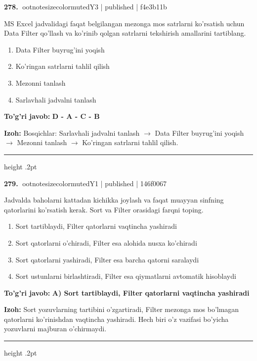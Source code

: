 \documentclass[10pt,a4paper]{article}
\begin{document}
\textbf{\color{ink}278.} {ootnotesizecolor{muted}Y3 | published | f4e3b11b}
\par
MS Excel jadvalidagi faqat belgilangan mezonga mos satrlarni ko'rsatish uchun Data Filter qo'llash va ko'rinib qolgan satrlarni tekshirish amallarini tartiblang.
\begin{enumerate}[label=\Alph*),leftmargin=9mm]
\item Data Filter buyrug'ini yoqish
\item Ko'ringan satrlarni tahlil qilish
\item Mezonni tanlash
\item Sarlavhali jadvalni tanlash
\end{enumerate}
\begin{tcolorbox}[enhanced,breakable,colback=teal!4,colframe=teal!55!black,boxrule=0.45pt,arc=1.2mm,left=2.8mm,right=2.8mm,top=2mm,bottom=2mm]
\textbf{\color{teal}To'g'ri javob:} \textbf{D - A - C - B}
\par\smallskip
\textbf{Izoh:} Bosqichlar: Sarlavhali jadvalni tanlash \ensuremath{\rightarrow} Data Filter buyrug'ini yoqish \ensuremath{\rightarrow} Mezonni tanlash \ensuremath{\rightarrow} Ko'ringan satrlarni tahlil qilish.
\end{tcolorbox}
\vspace{2mm}\hrule height .2pt\vspace{2mm}

\textbf{\color{ink}279.} {ootnotesizecolor{muted}Y1 | published | 146f0067}
\par
Jadvalda baholarni kattadan kichikka joylash va faqat muayyan sinfning qatorlarini ko'rsatish kerak. Sort va Filter orasidagi farqni toping.
\begin{enumerate}[label=\Alph*),leftmargin=9mm]
\item Sort tartiblaydi, Filter qatorlarni vaqtincha yashiradi
\item Sort qatorlarni o'chiradi, Filter esa alohida nusxa ko'chiradi
\item Sort qatorlarni yashiradi, Filter esa barcha qatorni saralaydi
\item Sort ustunlarni birlashtiradi, Filter esa qiymatlarni avtomatik hisoblaydi
\end{enumerate}
\begin{tcolorbox}[enhanced,breakable,colback=teal!4,colframe=teal!55!black,boxrule=0.45pt,arc=1.2mm,left=2.8mm,right=2.8mm,top=2mm,bottom=2mm]
\textbf{\color{teal}To'g'ri javob:} \textbf{A) Sort tartiblaydi, Filter qatorlarni vaqtincha yashiradi}
\par\smallskip
\textbf{Izoh:} Sort yozuvlarning tartibini o'zgartiradi, Filter mezonga mos bo'lmagan qatorlarni ko'rinishdan vaqtincha yashiradi. Hech biri o'z vazifasi bo'yicha yozuvlarni majburan o'chirmaydi.
\end{tcolorbox}
\vspace{2mm}\hrule height .2pt\vspace{2mm}
\end{document}
